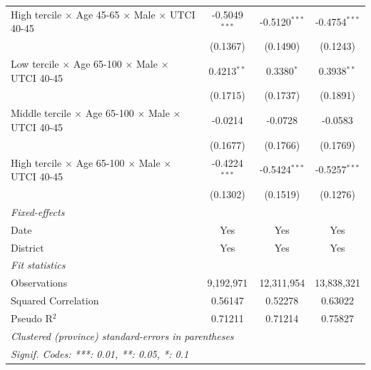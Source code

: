 \begin{table}[htbp]
\begin{tabular}{lccc}
      High tercile $\times$ Age 45-65 $\times$ Male $\times$ UTCI 40-45         & -0.5049$^{***}$ & -0.5120$^{***}$   & -0.4754$^{***}$\\   
                                                                                & (0.1367)        & (0.1490)          & (0.1243)\\   
      Low tercile $\times$ Age 65-100 $\times$ Male $\times$ UTCI 40-45         & 0.4213$^{**}$   & 0.3380$^{*}$      & 0.3938$^{**}$\\   
                                                                                & (0.1715)        & (0.1737)          & (0.1891)\\   
      Middle tercile $\times$ Age 65-100 $\times$ Male $\times$ UTCI 40-45      & -0.0214         & -0.0728           & -0.0583\\   
                                                                                & (0.1677)        & (0.1766)          & (0.1769)\\   
      High tercile $\times$ Age 65-100 $\times$ Male $\times$ UTCI 40-45        & -0.4224$^{***}$ & -0.5424$^{***}$   & -0.5257$^{***}$\\   
                                                                                & (0.1302)        & (0.1519)          & (0.1276)\\   
      \midrule
      \emph{Fixed-effects}\\
      Date                                                                      & Yes             & Yes               & Yes\\  
      District                                                                  & Yes             & Yes               & Yes\\  
      \midrule
      \emph{Fit statistics}\\
      Observations                                                              & 9,192,971       & 12,311,954        & 13,838,321\\  
      Squared Correlation                                                       & 0.56147         & 0.52278           & 0.63022\\  
      Pseudo R$^2$                                                              & 0.71211         & 0.71214           & 0.75827\\  
      \midrule \midrule
      \multicolumn{4}{l}{\emph{Clustered (province) standard-errors in parentheses}}\\
      \multicolumn{4}{l}{\emph{Signif. Codes: ***: 0.01, **: 0.05, *: 0.1}}\\
   \end{tabular}
\end{table}


